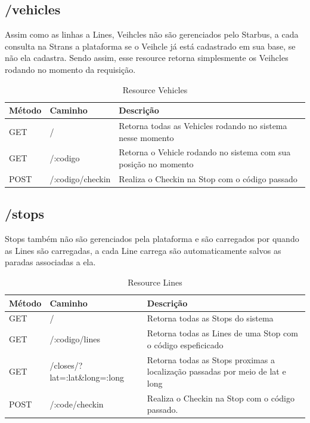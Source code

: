 \subsection{/vehicles}

Assim como as linhas a Lines, Veihcles não são gerenciados pelo Starbus, a cada consulta na Strans a 
plataforma se o Veihcle já está cadastrado em sua base, se não ela cadastra. Sendo assim, esse  resource
retorna simplesmente os Veihcles rodando no momento da requisição.

\begin{table}[htbp]
	\scriptsize
	\centering
	\begin{tabular}{|l|l|l|}
		\hline \textbf{Método} & \textbf{Caminho} & \textbf{Descrição} \\ 
    \hline GET    & /  & Retorna todas as Vehicles rodando no sistema nesse momento \\
    \hline GET    & /:codigo  & Retorna o Vehicle rodando no sistema com sua posição no momento \\
    \hline POST   & /:codigo/checkin & Realiza o Checkin na Stop com o código passado \\
    \hline 
	\end{tabular}
	\caption{Resource Vehicles}
	\label{tab:resources}
\end{table}


\subsection{/stops}

Stops também não são gerenciados pela plataforma e são carregados por quando as Lines são carregadas,
a cada Line carrega são automaticamente salvos as paradas associadas a ela.

\begin{table}[htbp]
	\scriptsize
	\centering
	\begin{tabular}{|l|l|l|}
		\hline \textbf{Método} & \textbf{Caminho} & \textbf{Descrição} \\ 
    \hline GET    & /               & Retorna todas as Stops do sistema \\
		\hline GET    & /:codigo/lines  & Retorna todas as Lines de uma Stop com o código espeficicado \\
    \hline GET    & /closes/?lat=:lat\&long=:long  & Retorna todas as Stops proximas a localização passadas por meio de lat e long \\
    \hline POST   & /:code/checkin & Realiza o Checkin na Stop com o código passado. \\
    \hline  
	\end{tabular}
	\caption{Resource Lines}
	\label{tab:resources}
\end{table}

